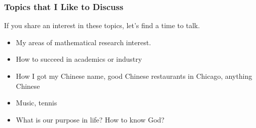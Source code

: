 \documentclass[10pt,compress,xcolor={usenames,dvipsnames},CJK]{beamer}
\begin{document}
\begin{frame}
\frametitle{Topics that I Like to Discuss}

If you share an interest in these topics, let's find a time to talk.
\begin{itemize}

\item My areas of mathematical research interest.

\item How to succeed in academics or industry

\item How I got my Chinese name, good Chinese restaurants in Chicago, anything Chinese

\item Music, tennis

\item What is our purpose in life?  How to know God?

\end{itemize}
\end{frame}
\end{document}

